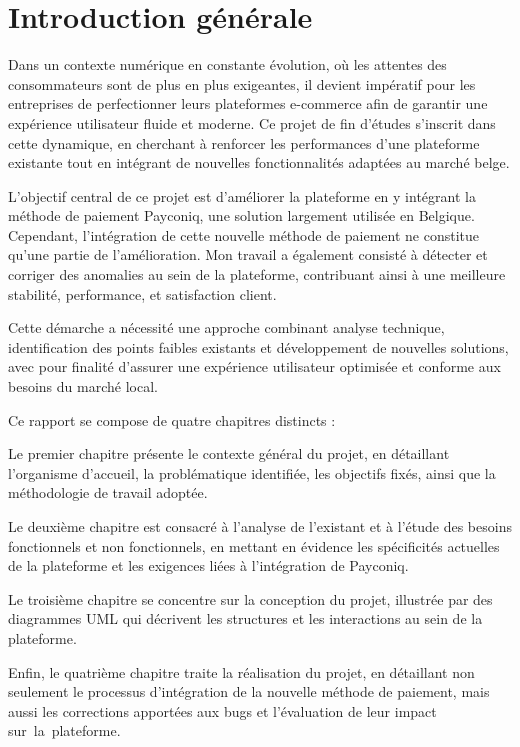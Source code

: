 \chapter*{Introduction générale}


Dans un contexte numérique en constante évolution, où les attentes des consommateurs sont de plus en plus exigeantes, il devient impératif pour les entreprises de perfectionner leurs plateformes e-commerce afin de garantir une expérience utilisateur fluide et moderne. Ce projet de fin d’études s’inscrit dans cette dynamique, en cherchant à renforcer les performances d’une plateforme existante tout en intégrant de nouvelles fonctionnalités adaptées au marché belge.

\vspace{10pt}

L’objectif central de ce projet est d’améliorer la plateforme en y intégrant la méthode de paiement Payconiq, une solution largement utilisée en Belgique. Cependant, l'intégration de cette nouvelle méthode de paiement ne constitue qu'une partie de l'amélioration. Mon travail a également consisté à détecter et corriger des anomalies au sein de la plateforme, contribuant ainsi à une meilleure stabilité, performance, et satisfaction client.

Cette démarche a nécessité une approche combinant analyse technique, identification des points faibles existants et développement de nouvelles solutions, avec pour finalité d’assurer une expérience utilisateur optimisée et conforme aux besoins du marché local. 

Ce rapport se compose de quatre chapitres distincts :

Le premier chapitre présente le contexte général du projet, en détaillant l'organisme d'accueil, la problématique identifiée, les objectifs fixés, ainsi que la méthodologie de travail adoptée.

Le deuxième chapitre est consacré à l'analyse de l'existant et à l'étude des besoins fonctionnels et non fonctionnels, en mettant en évidence les spécificités actuelles de la plateforme et les exigences liées à l'intégration de Payconiq.

Le troisième chapitre se concentre sur la conception du projet, illustrée par des diagrammes UML qui décrivent les structures et les interactions au sein de la plateforme.


Enfin, le quatrième chapitre traite la réalisation du projet, en détaillant non seulement le processus d’intégration de la nouvelle méthode de paiement, mais aussi les corrections apportées aux bugs et l’évaluation de leur impact sur la plateforme.
\vspace{10pt}


